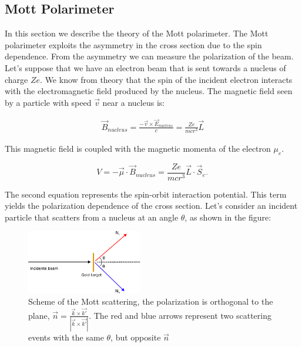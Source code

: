 \subsection{Mott Polarimeter}

In this section we describe the theory of the Mott polarimeter. The Mott polarimeter exploits the asymmetry in the cross section due to the spin dependence. From the asymmetry we can measure the polarization of the beam. 
Let's suppose that we have an electron beam that is sent towards a nucleus of charge $Ze$. We know from theory \cite{MottElectron} that the spin of the incident electron interacts with the electromagnetic field produced by the nucleus.
The magnetic field seen by a particle with speed $\vec{v}$ near a nucleus is:

\begin{align*}
\vec{B}_{nucleus} = \frac{-\vec{v} \times \vec{E}_{nucleus}}{c}  = \frac{Ze}{mc r^{3}} \vec{L} 
\end{align*}

This magnetic field is coupled with the magnetic momenta of the electron $\mu_{e}$.

\begin{equation}
V = - \vec{\mu} \cdot \vec{B}_{nucleus} = \frac{Ze}{mcr^{3}} \vec{L} \cdot \vec{S}_{e^{-}}
\end{equation}

The second equation represents the spin-orbit interaction potential. This term yields the polarization dependence of the cross section. Let's consider an incident particle that scatters from a nucleus at an angle $\theta$, as shown in the figure:

\begin{figure}[hbtp]
\centering
\includegraphics[width = 0.45\textwidth]{ExperimentalSetup/MottScattering.pdf}
\caption{Scheme of the Mott scattering, the polarization is orthogonal to the plane,  $ \vec{n} = \frac{\vec{k} \times \vec{k'}}{|\vec{k} \times \vec{k'}|}$. The red and blue arrows represent two scattering events with the same $\theta$, but opposite $\vec{n}$}
\label{fig:MottScatt}
\end{figure}

